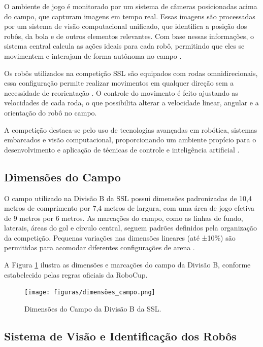 O ambiente de jogo é monitorado por um sistema de câmeras posicionadas acima do campo, que capturam imagens em tempo real. Essas imagens são processadas por um sistema de visão computacional unificado, que identifica a posição dos robôs, da bola e de outros elementos relevantes. Com base nessas informações, o sistema central calcula as ações ideais para cada robô, permitindo que eles se movimentem e interajam de forma autônoma no campo \cite{rocha2012ssl}.

Os robôs utilizados na competição SSL são equipados com rodas omnidirecionais, essa configuração permite realizar movimentos em qualquer direção sem a necessidade de reorientação \cite{romero2014robotica}. O controle do movimento é feito ajustando as velocidades de cada roda, o que possibilita alterar a velocidade linear, angular e a orientação do robô no campo.

A competição destaca-se pelo uso de tecnologias avançadas em robótica, sistemas embarcados e visão computacional, proporcionando um ambiente propício para o desenvolvimento e aplicação de técnicas de controle e inteligência artificial \cite{stone2000layered}.

\subsection{Dimensões do Campo}

O campo utilizado na Divisão B da SSL possui dimensões padronizadas de 10,4 metros de comprimento por 7,4 metros de largura, com uma área de jogo efetiva de 9 metros por 6 metros. As marcações do campo, como as linhas de fundo, laterais, áreas do gol e círculo central, seguem padrões definidos pela organização da competição. Pequenas variações nas dimensões lineares (até ±10\%) são permitidas para acomodar diferentes configurações de arena \cite{robocup2023rules}.

A Figura \ref{fig:dimensoes_campo } ilustra as dimensões e marcações do campo da Divisão B, conforme estabelecido pelas regras oficiais da RoboCup\cite{robocup2023rules}.

\begin{figure}[!htpb]
\centering
\caption{Dimensões do Campo da Divisão B da SSL.}
\texttt{[image: figuras/dimensões\_campo.png]}
\label{fig:dimensoes_campo }
\end{figure}

\subsection{Sistema de Visão e Identificação dos Robôs}

